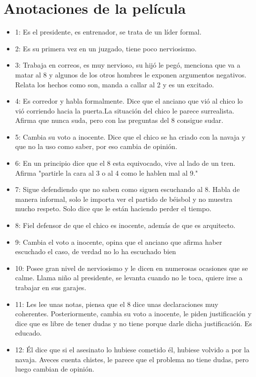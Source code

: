 \documentclass{article}
\begin{document}
\section{Anotaciones de la película}
\begin{itemize}
    \item 1: Es el presidente, es entrenador, se trata de un líder formal.
    \item 2: Es su primera vez en un juzgado, tiene poco nerviosismo.
    \item 3: Trabaja en correos, es muy nervioso, su hijó le pegó, menciona que va a matar al 8 y algunos de los otros hombres le exponen argumentos negativos. Relata los hechos como son, manda a callar al 2 y es un excitado.
    \item 4: Es corredor y habla formalmente. Dice que el anciano que vió al chico lo vió corriendo hacia la puerta.La situación del chico le parece surrealista. Afirma que nunca suda, pero con las preguntas del 8 consigue sudar.
    \item 5: Cambia su voto a inocente. Dice que el chico se ha criado con la navaja y que no la uso como saber, por eso cambia de opinión.
    \item 6: En un principio dice que el 8 esta equivocado, vive al lado de un tren. Afirma "partirle la cara al 3 o al 4 como le hablen mal al 9."
    \item 7: Sigue defendiendo que no saben como siguen escuchando al 8. Habla de manera informal, solo le importa ver el partido de béisbol y no muestra mucho respeto. Solo dice que le están haciendo perder el tiempo.
    \item 8: Fiel defensor de que el chico es inocente, además de que es arquitecto.
    \item 9: Cambia el voto a inocente, opina que el anciano que afirma haber escuchado el caso, de verdad no lo ha escuchado bien
    \item 10: Posee gran nivel de nerviosismo y le dicen en numerosas ocasiones que se calme. Llama niño al presidente, se levanta cuando no le toca, quiere irse a trabajar en sus garajes.
    \item 11: Les lee unas notas, piensa que el 8 dice unas declaraciones muy coherentes. Posteriormente, cambia su  voto a inocente, le piden justificación y dice que es libre de tener dudas y no tiene porque darle dicha justificación. Es educado.
    \item 12: Él dice que si el asesinato lo hubiese cometido él, hubiese volvido a por la navaja. Aveces cuenta chistes, le parece que el problema no tiene dudas, pero luego cambian de opinión.
\end{itemize}
\end{document}
